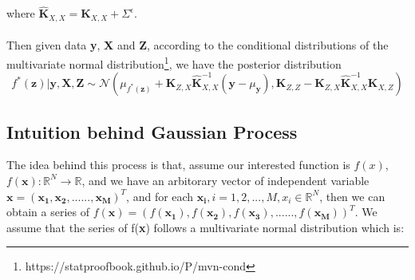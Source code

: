where $ \hat{\boldsymbol{K}}_{X, X} = \boldsymbol{K}_{X, X} + \varSigma^{\epsilon}$. \\ \\
Then given data \textbf{y}, \textbf{X} and \textbf{Z}, according to the conditional distributions of the multivariate normal distribution\footnote{https://statproofbook.github.io/P/mvn-cond}, we have the posterior distribution 
\begin{equation}
 f^{*}(\boldsymbol{z}) | \boldsymbol{y}, \boldsymbol{X},  \boldsymbol{Z} \sim  \mathcal{N}(\mu_{f^{*}(\boldsymbol{z})} + \boldsymbol{K}_{Z, X}\hat{\boldsymbol{K}}_{X, X}^{-1}(\boldsymbol{y} - \mu_{\boldsymbol{y}}), \boldsymbol{K}_{Z, Z} - \boldsymbol{K}_{Z, X}\hat{\boldsymbol{K}}_{X, X}^{-1}\boldsymbol{K}_{X, Z})
\end{equation}

\subsection{Intuition behind Gaussian Process}
The idea behind this process is that, assume our interested function is $f(x)$, $ f(\boldsymbol{x}): \mathbb{R}^N \to \mathbb{R}$, and we have an arbitorary vector of independent variable $\boldsymbol{x} = (\boldsymbol{x_1}, \boldsymbol{x_2,} ......, \boldsymbol{x_M})^T$, and for each $\boldsymbol{x_i}, i = 1, 2, ...,M, x_i \in \mathbb{R}^N$, then we can obtain a series of $f(\boldsymbol{x})= (f(\boldsymbol{x_1}), f(\boldsymbol{x_2}), f(\boldsymbol{x_3}), ......, f(\boldsymbol{x_M}) )^T$. We assume that the series of f(\textbf{x}) follows a multivariate normal distribution which is: 

